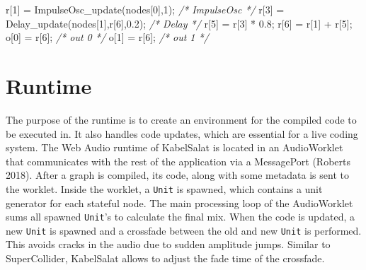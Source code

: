 \documentclass[11pt,]{article}
\newenvironment{Shaded}{}{}
\newcommand{\CommentTok}[1]{\textcolor[rgb]{0.38,0.63,0.69}{\textit{#1}}}
\newcommand{\DecValTok}[1]{\textcolor[rgb]{0.25,0.63,0.44}{#1}}
\newcommand{\FloatTok}[1]{\textcolor[rgb]{0.25,0.63,0.44}{#1}}
\newcommand{\NormalTok}[1]{#1}
\newcommand{\OperatorTok}[1]{\textcolor[rgb]{0.40,0.40,0.40}{#1}}
\begin{document}
\begin{Shaded}
\begin{Highlighting}[]
\NormalTok{r}\OperatorTok{[}\DecValTok{1}\OperatorTok{]} \OperatorTok{=}\NormalTok{ ImpulseOsc\_update}\OperatorTok{(}\NormalTok{nodes}\OperatorTok{[}\DecValTok{0}\OperatorTok{],}\DecValTok{1}\OperatorTok{);} \CommentTok{/* ImpulseOsc */}
\NormalTok{r}\OperatorTok{[}\DecValTok{3}\OperatorTok{]} \OperatorTok{=}\NormalTok{ Delay\_update}\OperatorTok{(}\NormalTok{nodes}\OperatorTok{[}\DecValTok{1}\OperatorTok{],}\NormalTok{r}\OperatorTok{[}\DecValTok{6}\OperatorTok{],}\FloatTok{0.2}\OperatorTok{);} \CommentTok{/* Delay */}
\NormalTok{r}\OperatorTok{[}\DecValTok{5}\OperatorTok{]} \OperatorTok{=}\NormalTok{ r}\OperatorTok{[}\DecValTok{3}\OperatorTok{]} \OperatorTok{*} \FloatTok{0.8}\OperatorTok{;}
\NormalTok{r}\OperatorTok{[}\DecValTok{6}\OperatorTok{]} \OperatorTok{=}\NormalTok{ r}\OperatorTok{[}\DecValTok{1}\OperatorTok{]} \OperatorTok{+}\NormalTok{ r}\OperatorTok{[}\DecValTok{5}\OperatorTok{];}
\NormalTok{o}\OperatorTok{[}\DecValTok{0}\OperatorTok{]} \OperatorTok{=}\NormalTok{ r}\OperatorTok{[}\DecValTok{6}\OperatorTok{];} \CommentTok{/* out 0 */}
\NormalTok{o}\OperatorTok{[}\DecValTok{1}\OperatorTok{]} \OperatorTok{=}\NormalTok{ r}\OperatorTok{[}\DecValTok{6}\OperatorTok{];} \CommentTok{/* out 1 */}
\end{Highlighting}
\end{Shaded}

\section{Runtime}\label{runtime}

The purpose of the runtime is to create an environment for the compiled
code to be executed in. It also handles code updates, which are
essential for a live coding system. The Web Audio runtime of KabelSalat
is located in an AudioWorklet that communicates with the rest of the
application via a MessagePort (Roberts 2018). After a graph is compiled,
its code, along with some metadata is sent to the worklet. Inside the
worklet, a \texttt{Unit} is spawned, which contains a unit generator for
each stateful node. The main processing loop of the AudioWorklet sums
all spawned \texttt{Unit}'s to calculate the final mix. When the code is
updated, a new \texttt{Unit} is spawned and a crossfade between the old
and new \texttt{Unit} is performed. This avoids cracks in the audio due
to sudden amplitude jumps. Similar to SuperCollider, KabelSalat allows
to adjust the fade time of the crossfade.
\end{document}

